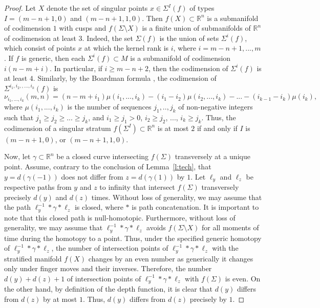 \documentclass[12pt]{amsart}
\def \R{\mathbb{R}}
\def\co{\colon}
\def\mod{{\mathop\mathrm{mod}\ }}
\theoremstyle{definition}
\begin{document}
 \begin{proof}  Let $X$ denote the set of singular points $x\in \Sigma^I(f)$ of types $I=(m-n+1, 0)$ and $(m-n+1, 1, 0)$. Then $f(X)\subset \R^n$ is a submanifold of codimension $1$ with cusps and $f(\Sigma \setminus X)$ is a finite union of submanifolds of $\R^n$ of codimension at least $3$. Indeed, the set $\Sigma(f)$ is the union of sets $\Sigma^{i}(f)$, which consist of points $x$ at which the kernel rank is $i$,  where $i= m-n+1 ,..., m$. If $f$ is generic, then each $\Sigma^i(f) \subset M$ is a submanifold of codimension $i(n-m+i)$. In particular, if $i\ge m-n+2$, then the codimension of $\Sigma^{i}(f)$ is at least $4$.  Similarly, by the Boardman formula \cite[\S 2.5]{AVGZ},  the codimension of $\Sigma^{i_1, i_2, ,..., i_k}(f)$ is
  \[
   \nu_{i_1,..., i_k}(m,n)=(n-m+i_1)\mu(i_1,..., i_k)-(i_1-i_2)\mu(i_2,..., i_k)-...-(i_{k-1}-i_k)\mu(i_k),
  \] 
  where $\mu(i_1,..., i_k)$ is the number of sequences $j_1,.., j_k$ of non-negative integers such that $j_1\ge j_2\ge ...\ge j_k$,  and $i_1\ge j_1>0$, $i_2\ge j_2$, ..., $i_k\ge j_k$. Thus, the codimension of a singular stratum $f(\Sigma^I) \subset \R^n$ is at most $2$ if and only if $I$ is $(m-n+1,0)$, or $(m-n+1, 1, 0)$. 
 
Now,  let $\gamma \subset \R^n$ be a closed curve intersecting $f(\Sigma)$ transversely at a unique point. Assume,  contrary to the conclusion of Lemma~\ref{l:tech}, that $y=d(\gamma(-1))$ does not differ from $z=d(\gamma(1))$ by $1$. Let $\ell_y$ and $\ell_z$ be respective paths from $y$ and $z$ to infinity that intersect $f(\Sigma)$ transversely precisely $d(y)$ and $d(z)$ times.  Without loss of generality, we may assume that the path $\ell_y^{-1}*\gamma*\ell_z$ is closed,  where $*$ is path concatenation.  It is important to note that this closed path is null-homotopic.  Furthermore, without loss of generality,  we may assume that $\ell_y^{-1}*\gamma*\ell_z$ avoids $f(\Sigma\setminus X)$ for all moments of time during the homotopy to a point. Thus,  under the specified generic homotopy of $\ell_y^{-1}*\gamma*\ell_z$,  the number of intersection points of $\ell_y^{-1}*\gamma*\ell_z$ with the stratified manifold $f(X)$ changes by an even  number as generically it changes only under finger moves and their inverses.  Therefore,  the number $d(y)+d(z)+1$ of intersection points of $\ell_y^{-1}*\gamma*\ell_z$ with $f(\Sigma)$ is even.  On the other hand,  by definition of the depth function, it is clear that $d(y)$ differs from $d(z)$ by at most $1$. Thus, $d(y)$ differs from $d(z)$ precisely by $1$. 
\end{proof}
\end{document}
